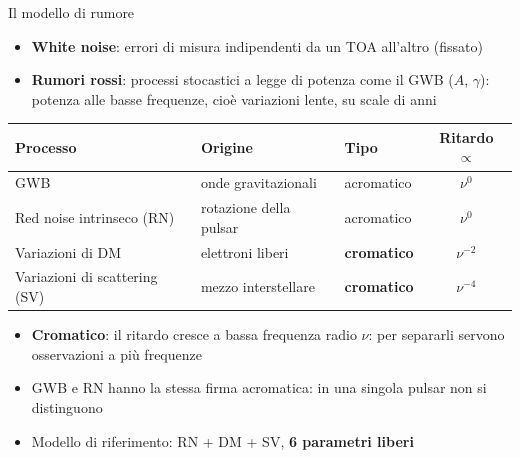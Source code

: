 \begin{frame}{Il modello di rumore}
  \small
  \begin{itemize}\setlength{\itemsep}{2pt}
    \item \textbf{White noise}: errori di misura indipendenti da un TOA all'altro (fissato)
    \item \textbf{Rumori rossi}: processi stocastici a legge di potenza come il GWB ($A$, $\gamma$):
          potenza alle basse frequenze, cioè variazioni lente, su scale di anni
  \end{itemize}
  \vspace{2mm}
  \centering
  \renewcommand{\arraystretch}{1.1}
  \begin{tabular}{lllc}
    \toprule
    Processo & Origine & Tipo & Ritardo $\propto$ \\
    \midrule
    GWB                       & onde gravitazionali   & acromatico & $\nu^{0}$ \\
    Red noise intrinseco (RN) & rotazione della pulsar & acromatico & $\nu^{0}$ \\
    Variazioni di DM          & elettroni liberi & \textbf{cromatico} & $\nu^{-2}$ \\
    Variazioni di scattering (SV) & mezzo interstellare & \textbf{cromatico} & $\nu^{-4}$ \\
    \bottomrule
  \end{tabular}
  \vspace{2mm}
  \begin{itemize}\setlength{\itemsep}{2pt}
    \item \textbf{Cromatico}: il ritardo cresce a bassa frequenza radio $\nu$:
          per separarli servono osservazioni a più frequenze
    \item GWB e RN hanno la stessa firma acromatica: in una singola pulsar non si distinguono
    \item Modello di riferimento: RN + DM + SV, \textbf{6 parametri liberi}
  \end{itemize}
\end{frame}
